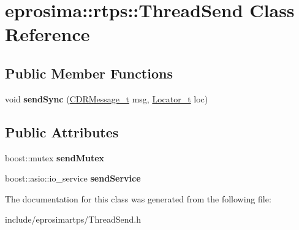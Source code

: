 \hypertarget{classeprosima_1_1rtps_1_1_thread_send}{\section{eprosima\-:\-:rtps\-:\-:\-Thread\-Send \-Class \-Reference}
\label{classeprosima_1_1rtps_1_1_thread_send}
}
\subsection*{\-Public \-Member \-Functions}
\begin{DoxyCompactItemize}
\item 
\hypertarget{classeprosima_1_1rtps_1_1_thread_send_a7b9e284faeb5a87a68c9760a24d5686e}{void {\bfseries send\-Sync} (\hyperlink{structeprosima_1_1rtps_1_1_c_d_r_message__t}{\-C\-D\-R\-Message\-\_\-t} msg, \hyperlink{structeprosima_1_1rtps_1_1_locator__t}{\-Locator\-\_\-t} loc)}\label{classeprosima_1_1rtps_1_1_thread_send_a7b9e284faeb5a87a68c9760a24d5686e}

\end{DoxyCompactItemize}
\subsection*{\-Public \-Attributes}
\begin{DoxyCompactItemize}
\item 
\hypertarget{classeprosima_1_1rtps_1_1_thread_send_aadda17d281ce91914182fa6a7b118490}{boost\-::mutex {\bfseries send\-Mutex}}\label{classeprosima_1_1rtps_1_1_thread_send_aadda17d281ce91914182fa6a7b118490}

\item 
\hypertarget{classeprosima_1_1rtps_1_1_thread_send_a7bcaefbe32768965714c32d7b6110a68}{boost\-::asio\-::io\-\_\-service {\bfseries send\-Service}}\label{classeprosima_1_1rtps_1_1_thread_send_a7bcaefbe32768965714c32d7b6110a68}

\end{DoxyCompactItemize}


\-The documentation for this class was generated from the following file\-:\begin{DoxyCompactItemize}
\item 
include/eprosimartps/\-Thread\-Send.\-h\end{DoxyCompactItemize}
